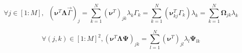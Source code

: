 \documentclass[aps,12pt]{revtex4}
\begin{document}
\begin{equation}
	\forall j \in [1:M], \;\; (\bm{\nu}^T     \bm{\Lambda} \vec{\Gamma})_j = \sum_{k=1}^N (\bm{\nu}^T)_{jk} \lambda_k \Gamma_k = 
	\sum_{k=1}^N (\bm{\nu}^T_{kj}\Gamma_k)  \lambda_k = \sum_{k=1}^N \bm{\Omega}_{jk} \lambda_k
\end{equation}

\begin{equation}
	\forall (j,k) \in [1:M]^2, (\bm{\nu}^T   \bm{\Lambda} \bm{\Psi})_{jk} 
	= \sum_{l=1}^N (\bm{\nu}^T)_{jl} \lambda_l \bm{\Psi}_{lk}
\end{equation}



 
\end{document}
